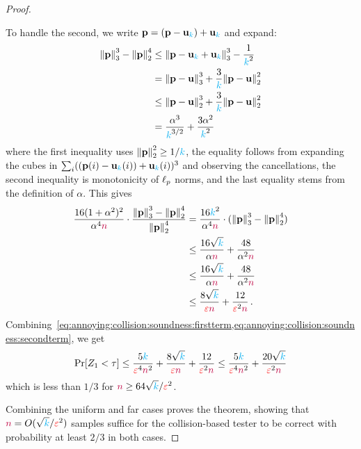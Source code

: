 \begin{proof}
\begin{itemize}
    To handle the second, we write $\p=(\p-\uniform_\ab)+\uniform_\ab$ and expand:%
    \begin{align*}
        \norm{\p}_3^3-\normtwo{\p}^4
        &\leq \norm{\p-\uniform_\ab+\uniform_\ab}_3^3-\frac{1}{\ab^2} \\
        &= \norm{\p-\uniform}_3^3 + \frac{3}{\ab}\normtwo{\p-\uniform}^2 \\
        &\leq \normtwo{\p-\uniform}^3 + \frac{3}{\ab}\normtwo{\p-\uniform}^2\\
        &= \frac{\alpha^{3}}{\ab^{3/2}} + \frac{3\alpha^2}{\ab^2}
    \end{align*}
    where the first inequality uses $\normtwo{\p}^2 \geq 1/\ab$, the equality follows from expanding the cubes in $\sum_i ((\p(i)-\uniform_\ab(i))+\uniform_\ab(i))^3$ and observing the cancellations, the second inequality is monotonicity of $\lp[p]$ norms, and the last equality stems from the definition of $\alpha$. This gives
    \begin{align}
        \frac{16(1+\alpha^2)^2}{\alpha^4\ns}\cdot \frac{\norm{\p}_3^3-\normtwo{\p}^4}{\normtwo{\p}^4}
        &= \frac{16\ab^2}{\alpha^4\ns}\cdot (\norm{\p}_3^3-\normtwo{\p}^4) \notag\\
        &\leq \frac{16\sqrt{\ab}}{\alpha\ns}+ \frac{48}{\alpha^2\ns} \notag\\
        &\leq \frac{16\sqrt{\ab}}{\alpha\ns}+ \frac{48}{\alpha^2\ns} \notag\\
        &\leq \frac{8\sqrt{\ab}}{\dst\ns}+ \frac{12}{\dst^2\ns}\,. \label{eq:annoying:collision:soundness:secondterm}
    \end{align}
    Combining~\cref{eq:annoying:collision:soundness:firstterm,eq:annoying:collision:soundness:secondterm}, we get
    \[
        \bPr{Z_1 < \tau} \leq \frac{5\ab}{\dst^4\ns^2} + \frac{8\sqrt{\ab}}{\dst\ns}+ \frac{12}{\dst^2\ns}
        \leq \frac{5\ab}{\dst^4\ns^2} + \frac{20\sqrt{\ab}}{\dst^2\ns}
    \]
    which is less than $1/3$ for $\ns \geq 64\sqrt{\ab}/\dst^2$.
  \end{itemize}
  Combining the uniform and far cases proves the theorem, showing that $\ns = O(\sqrt{\ab}/\dst^2)$ samples suffice for the collision-based tester to be correct with probability at least $2/3$ in both cases.
\end{proof}


